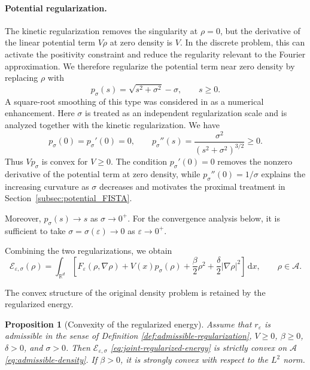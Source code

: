 \documentclass[11pt]{article}
\newcommand{\R}{\mathbb{R}}
\newcommand{\A}{\mathcal{A}}
\newcommand{\E}{\mathcal{E}}
\newcommand{\dd}{\,\mathrm{d}}
\newcommand{\eps}{\varepsilon}
\newcommand{\sig}{\sigma}
\theoremstyle{plain}
\newtheorem{proposition}[theorem]{Proposition}
\theoremstyle{definition}
\numberwithin{equation}{section}
\begin{document}
\paragraph{Potential regularization.}

The kinetic regularization removes the singularity at $\rho=0$, but
the derivative of the linear potential term $V\rho$ at zero density
is $V$. In the discrete problem, this can activate the positivity
constraint and reduce the regularity relevant to the Fourier
approximation. We therefore regularize the potential term near zero
density by replacing $\rho$ with
\begin{equation}
\label{eq:potential-regularizer}
p_\sig(s)
=
\sqrt{s^2+\sig^2}-\sig,
\qquad s\ge0.
\end{equation}
A square-root smoothing of this type was considered in
\cite{BaoRuan2019} as a numerical enhancement. Here $\sig$ is treated
as an independent regularization scale and is analyzed together with
the kinetic regularization. We have
\begin{equation}
\label{eq:potential-regularizer-derivatives}
p_\sig(0)=p_\sig'(0)=0,
\qquad
p_\sig''(s)
=
\frac{\sig^2}{(s^2+\sig^2)^{3/2}}
\ge0.
\end{equation}
Thus $Vp_\sig$ is convex for $V\ge0$. The condition
$p_\sig'(0)=0$ removes the nonzero derivative of the potential term
at zero density, while
$p_\sig''(0)=1/\sig$ explains the increasing curvature as $\sig$
decreases and motivates the proximal treatment in
Section~\ref{subsec:potential_FISTA}.

Moreover, $p_\sig(s)\to s$ as $\sig\to0^+$. For the convergence
analysis below, it is sufficient to take
$\sig=\sig(\eps)\to0$ as $\eps\to0^+$.

Combining the two regularizations, we obtain
\begin{equation}
\label{eq:joint-regularized-energy}
\E_{\eps,\sig}(\rho)
=
\int_{\R^d}
\left[
F_\eps(\rho,\nabla\rho)
+V(x)p_\sig(\rho)
+\frac{\beta}{2}\rho^2
+\frac{\delta}{2}|\nabla\rho|^2
\right]\dd x,
\qquad
\rho\in\A.
\end{equation}

The convex structure of the original density problem is retained by
the regularized energy.

\begin{proposition}[Convexity of the regularized energy]
\label{prop:joint-convexity}
Assume that $r_\eps$ is admissible in the sense of Definition \ref{def:admissible-regularization}, $V\ge0$, $\beta\ge0$,
$\delta>0$, and $\sig>0$.
Then $\E_{\eps,\sig}$ \eqref{eq:joint-regularized-energy} is strictly convex on $\A$ \eqref{eq:admissible-density}.
If $\beta>0$, it is strongly convex with respect to the $L^2$ norm.
\end{proposition}
\end{document}
